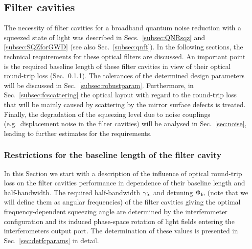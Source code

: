 \FloatBarrier
\subsection{Filter cavities}\label{sec:filtercavities}

The necessity of filter cavities for a broadband quantum noise reduction with a squeezed state of light was described in Secs.~\ref{subsec:QNRsqz} and \ref{subsec:SQZforGWD} (see also Sec.~\ref{subsec:qnft}). In the following sections, the technical requirements for these optical filters are discussed. An important point is the required baseline length of these filter cavities in view of their optical round-trip loss (Sec.~\ref{subsec:FClength}). The tolerances of the determined design parameters will be discussed in Sec.~\ref{subsec:robustparam}.   Furthermore, in Sec.~\ref{subsec:fcscattering} the optical layout with regard to the round-trip loss that will be mainly caused by scattering by the mirror surface defects is treated. Finally, the degradation of the squeezing level due to noise couplings (e.g.\ displacement noise in the filter cavities) will be analysed in Sec.~\ref{sec:noise}, leading to further estimates for the requirements.





\FloatBarrier
\subsubsection{Restrictions for the baseline length of the filter cavity}\label{subsec:FClength}

In this Section we start with a description of the influence of optical round-trip loss on the filter cavities performance in dependence of their baseline length and half-bandwidth. The required half-bandwidth $\gamma_{\rm fc}$ and detuning
$\Phi_{\rm fc}$
(note that we will define them as angular
frequencies) of the filter cavities giving the optimal frequency-dependent squeezing angle are determined by the interferometer
configuration and its induced phase-space rotation of light fields
entering the interferometers output port. The determination of these values is presented in Sec.~\ref{sec:detfcparams} in detail.

